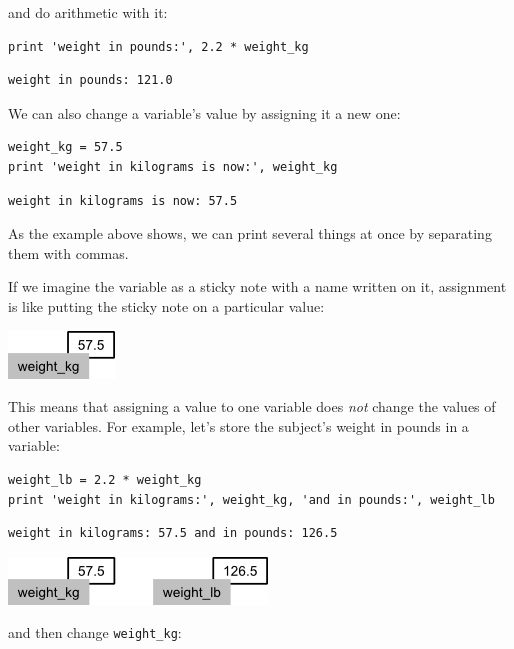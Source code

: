 \documentclass{book}
\begin{document}
and do arithmetic with it:

\begin{verbatim}
print 'weight in pounds:', 2.2 * weight_kg
\end{verbatim}

\begin{verbatim}
weight in pounds: 121.0
\end{verbatim}

We can also change a variable's value by assigning it a new one:

\begin{verbatim}
weight_kg = 57.5
print 'weight in kilograms is now:', weight_kg
\end{verbatim}

\begin{verbatim}
weight in kilograms is now: 57.5
\end{verbatim}

As the example above shows, we can print several things at once by
separating them with commas.

If we imagine the variable as a sticky note with a name written on it,
assignment is like putting the sticky note on a particular value:

\includegraphics{novice/python/img/python-sticky-note-variables-01.png}

This means that assigning a value to one variable does \emph{not} change
the values of other variables. For example, let's store the subject's
weight in pounds in a variable:

\begin{verbatim}
weight_lb = 2.2 * weight_kg
print 'weight in kilograms:', weight_kg, 'and in pounds:', weight_lb
\end{verbatim}

\begin{verbatim}
weight in kilograms: 57.5 and in pounds: 126.5
\end{verbatim}

\includegraphics{novice/python/img/python-sticky-note-variables-02.png}

and then change \texttt{weight\_kg}:
\end{document}
